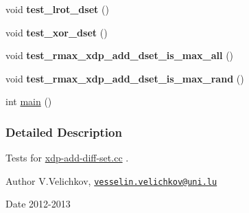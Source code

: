\begin{DoxyCompactItemize}
\item 
\hypertarget{xdp-add-diff-set-tests_8cc_a87e07ec417522791e57cf5372a35c06c}{void {\bfseries test\-\_\-lrot\-\_\-dset} ()}\label{xdp-add-diff-set-tests_8cc_a87e07ec417522791e57cf5372a35c06c}

\item 
\hypertarget{xdp-add-diff-set-tests_8cc_a3cf73a77ffe688d10b7369c991c70bc3}{void {\bfseries test\-\_\-xor\-\_\-dset} ()}\label{xdp-add-diff-set-tests_8cc_a3cf73a77ffe688d10b7369c991c70bc3}

\item 
\hypertarget{xdp-add-diff-set-tests_8cc_a0479711bf62f58eae82f4da21b73cbea}{void {\bfseries test\-\_\-rmax\-\_\-xdp\-\_\-add\-\_\-dset\-\_\-is\-\_\-max\-\_\-all} ()}\label{xdp-add-diff-set-tests_8cc_a0479711bf62f58eae82f4da21b73cbea}

\item 
\hypertarget{xdp-add-diff-set-tests_8cc_af9615040a37d87814a5fb44fdfd81917}{void {\bfseries test\-\_\-rmax\-\_\-xdp\-\_\-add\-\_\-dset\-\_\-is\-\_\-max\-\_\-rand} ()}\label{xdp-add-diff-set-tests_8cc_af9615040a37d87814a5fb44fdfd81917}

\item 
int \hyperlink{xdp-add-diff-set-tests_8cc_ae66f6b31b5ad750f1fe042a706a4e3d4}{main} ()
\end{DoxyCompactItemize}


\subsubsection{\-Detailed \-Description}
\-Tests for \hyperlink{xdp-add-diff-set_8cc}{xdp-\/add-\/diff-\/set.\-cc} . \begin{DoxyAuthor}{\-Author}
\-V.\-Velichkov, \href{mailto:vesselin.velichkov@uni.lu}{\tt vesselin.\-velichkov@uni.\-lu} 
\end{DoxyAuthor}
\begin{DoxyDate}{\-Date}
2012-\/2013 
\end{DoxyDate}


